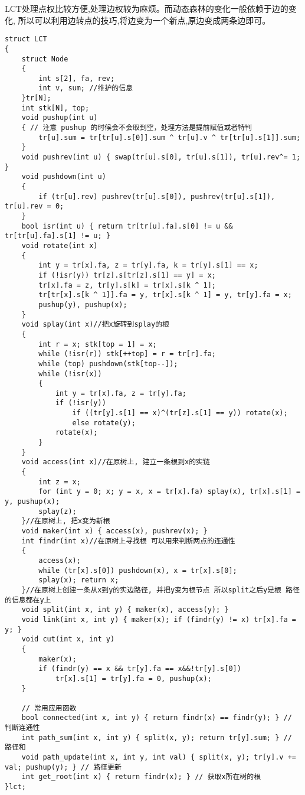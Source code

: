\documentclass[a4paper,fontset=none]{ctexart}
\begin{document}
LCT处理点权比较方便,处理边权较为麻烦。而动态森林的变化一般依赖于边的变化,
所以可以利用边转点的技巧,将边变为一个新点,原边变成两条边即可。
\begin{verbatim}
struct LCT
{
    struct Node
    {
        int s[2], fa, rev;
        int v, sum; //维护的信息
    }tr[N];
    int stk[N], top;
    void pushup(int u)
    { // 注意 pushup 的时候会不会取到空，处理方法是提前赋值或者特判
        tr[u].sum = tr[tr[u].s[0]].sum ^ tr[u].v ^ tr[tr[u].s[1]].sum;
    }
    void pushrev(int u) { swap(tr[u].s[0], tr[u].s[1]), tr[u].rev^= 1; }
    void pushdown(int u)
    {
        if (tr[u].rev) pushrev(tr[u].s[0]), pushrev(tr[u].s[1]), tr[u].rev = 0;
    }
    bool isr(int u) { return tr[tr[u].fa].s[0] != u && tr[tr[u].fa].s[1] != u; }
    void rotate(int x)
    {
        int y = tr[x].fa, z = tr[y].fa, k = tr[y].s[1] == x;
        if (!isr(y)) tr[z].s[tr[z].s[1] == y] = x;
        tr[x].fa = z, tr[y].s[k] = tr[x].s[k ^ 1];
        tr[tr[x].s[k ^ 1]].fa = y, tr[x].s[k ^ 1] = y, tr[y].fa = x;
        pushup(y), pushup(x);
    }
    void splay(int x)//把x旋转到splay的根
    {
        int r = x; stk[top = 1] = x;
        while (!isr(r)) stk[++top] = r = tr[r].fa;
        while (top) pushdown(stk[top--]);
        while (!isr(x))
        {
            int y = tr[x].fa, z = tr[y].fa;
            if (!isr(y))
                if ((tr[y].s[1] == x)^(tr[z].s[1] == y)) rotate(x);
                else rotate(y);
            rotate(x);
        }
    }
    void access(int x)//在原树上, 建立一条根到x的实链
    {
        int z = x;
        for (int y = 0; x; y = x, x = tr[x].fa) splay(x), tr[x].s[1] = y, pushup(x);
        splay(z);
    }//在原树上, 把x变为新根
    void maker(int x) { access(x), pushrev(x); }
    int findr(int x)//在原树上寻找根 可以用来判断两点的连通性
    {
        access(x);
        while (tr[x].s[0]) pushdown(x), x = tr[x].s[0];
        splay(x); return x;
    }//在原树上创建一条从x到y的实边路径, 并把y变为根节点 所以split之后y是根 路径的信息都在y上
    void split(int x, int y) { maker(x), access(y); }
    void link(int x, int y) { maker(x); if (findr(y) != x) tr[x].fa = y; }
    void cut(int x, int y)
    {
        maker(x);
        if (findr(y) == x && tr[y].fa == x&&!tr[y].s[0])
            tr[x].s[1] = tr[y].fa = 0, pushup(x);
    }

    // 常用应用函数
    bool connected(int x, int y) { return findr(x) == findr(y); } // 判断连通性
    int path_sum(int x, int y) { split(x, y); return tr[y].sum; } // 路径和
    void path_update(int x, int y, int val) { split(x, y); tr[y].v += val; pushup(y); } // 路径更新
    int get_root(int x) { return findr(x); } // 获取x所在树的根
}lct;

\end{verbatim}
\end{document}
